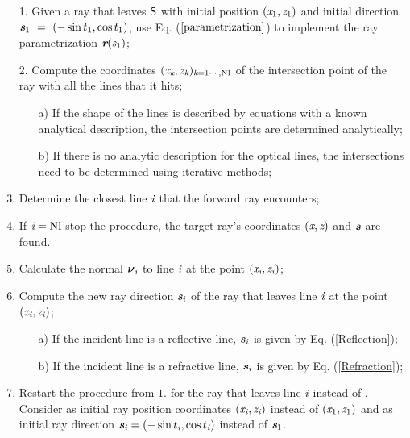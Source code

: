 \begin{enumerate}
 \item[1. ] Given a ray that leaves $\textsf{S}$ with initial position $(\textit{x}_1, \textit{z}_1)$ and initial direction $\textit{\textbf{s}}_1~=~(-\sin t_1, \cos t_1)$, use Eq. ($\ref{parametrization}$) to implement the ray parametrization $\textit{\textbf{r}}(\textit{s}_1)$;
\item[2. ] Compute the coordinates $(\textit{x}_{\textit{k}}, \textit{z}_{\textit{k}})_{\textit{k} = 1\cdots, \textrm{Nl}}$ of the intersection point of the ray with all the lines that it hits;
\begin{itemize}
\item[a)] If the shape of the lines is described by equations with a known analytical description, the intersection points are determined analytically;
\item[b)] If there is no analytic description for the optical lines, the intersections need to be determined using iterative methods;
\end{itemize}
\item  Determine the closest line $\textit{i}$ that the forward ray encounters;
\item If $\textit{i} = \textrm{Nl}$ stop the procedure, the target ray's coordinates $(\textit{x}, \textit{z})$ and $\textit{\textbf{s}}$ are found.
\item Calculate the normal $\boldsymbol{\nu}_{\textit{i}}$ to line $\textit{i}$ at the point $(\textit{x}_{\textit{i}}, \textit{z}_{\textit{i}})$;
 \item Compute the new ray direction $\textit{\textbf{s}}_{\textit{i}}$ of the ray that leaves line $\textit{i}$ at the point $(\textit{x}_{\textit{i}}, \textit{z}_{\textit{i}})$;
\begin{itemize}
\item[a)] If the incident line is a reflective line, $\textit{\textbf{s}}_{\textit{i}}$ is given by Eq. (\ref{Reflection});
\item[b)] If the incident line is a refractive line, $\textit{\textbf{s}}_{\textit{i}}$ is given by Eq. (\ref{Refraction});
\end{itemize}
\item Restart the procedure from $1.$ for the ray that leaves line $\textit{i}$ instead of . Consider as initial ray position coordinates $(\textit{x}_{\textit{i}}, \textit{z}_{\textit{i}})$ instead of $(\textit{x}_1, \textit{z}_1)$ and as initial ray direction $\textit{\textbf{s}}_{\textit{i}}= (-\sin t_{\textit{i}}, \cos t_{\textit{i}})$ instead of $\textit{\textbf{s}}_1$.
\end{enumerate}
